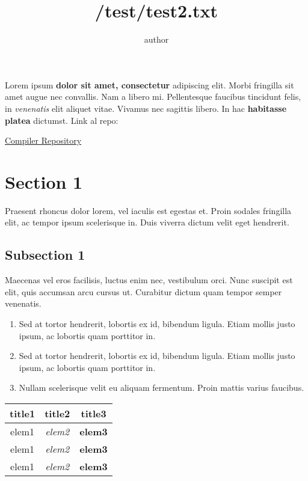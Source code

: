 \documentclass{article}
\title{/test/test2.txt}
\author{author}
\begin{document}
\maketitle
Lorem ipsum \textbf{dolor sit amet, consectetur} adipiscing elit. Morbi fringilla sit amet augue nec convallis.
Nam a libero mi. Pellentesque faucibus tincidunt felis, in \textit{venenatis} elit aliquet vitae.
Vivamus nec sagittis libero. In hac \textbf{habitasse platea} dictumst. Link al repo:

\href{https://github.com/GoolberthUCSP/compiler}{Compiler Repository}

\section{ Section 1}

Praesent rhoncus dolor lorem, vel iaculis est egestas et. Proin sodales fringilla elit,
ac tempor ipsum scelerisque in. Duis viverra dictum velit eget hendrerit.

\subsection{ Subsection 1}

Maecenas vel eros facilisis, luctus enim nec, vestibulum orci. Nunc suscipit est elit,
quis accumsan arcu cursus ut. Curabitur dictum quam tempor semper venenatis.

\begin{enumerate}
\item Sed at tortor hendrerit, lobortis ex id, bibendum ligula. Etiam mollis justo ipsum, ac lobortis quam porttitor in.
\item Sed at tortor hendrerit, lobortis ex id, bibendum ligula. Etiam mollis justo ipsum, ac lobortis quam porttitor in.
\item Nullam scelerisque velit eu aliquam fermentum. Proin mattis varius faucibus.
\end{enumerate}

\begin{table}[h!]
\centering
\begin{tabular}{||c c c||}
\hline
title1 & title2 & title3\\
\hline\hline
 elem1  &  \textit{elem2}  &  \textbf{elem3}\\
 elem1  &  \textit{elem2}  &  \textbf{elem3}\\
 elem1  &  \textit{elem2}  &  \textbf{elem3}\\
\hline
\end{tabular}
\end{table}
\end{document}
